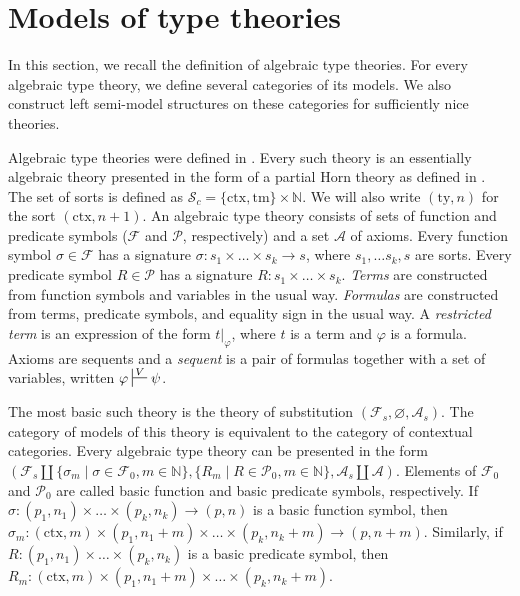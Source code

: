 \documentclass[reqno]{amsart}
\theoremstyle{definition}
\theoremstyle{remark}
\newcommand{\fs}[1]{\mathrm{#1}}
\numberwithin{figure}{section}
\begin{document}
\section{Models of type theories}

In this section, we recall the definition of algebraic type theories.
For every algebraic type theory, we define several categories of its models.
We also construct left semi-model structures on these categories for sufficiently nice theories.

Algebraic type theories were defined in \cite{alg-tt}.
Every such theory is an essentially algebraic theory presented in the form of a partial Horn theory as defined in \cite{PHL}.
The set of sorts is defined as $\mathcal{S}_c = \{ \fs{ctx}, \fs{tm} \} \times \mathbb{N}$.
We will also write $(\fs{ty},n)$ for the sort $(\fs{ctx},n+1)$.
An algebraic type theory consists of sets of function and predicate symbols ($\mathcal{F}$ and $\mathcal{P}$, respectively) and a set $\mathcal{A}$ of axioms.
Every function symbol $\sigma \in \mathcal{F}$ has a signature $\sigma : s_1 \times \ldots \times s_k \to s$, where $s_1, \ldots s_k, s$ are sorts.
Every predicate symbol $R \in \mathcal{P}$ has a signature $R : s_1 \times \ldots \times s_k$.
\emph{Terms} are constructed from function symbols and variables in the usual way.
\emph{Formulas} are constructed from terms, predicate symbols, and equality sign in the usual way.
A \emph{restricted term} is an expression of the form $t|_\varphi$, where $t$ is a term and $\varphi$ is a formula.
Axioms are sequents and a \emph{sequent} is a pair of formulas together with a set of variables, written $\varphi \sststile{}{V} \psi$.

The most basic such theory is the theory of substitution $(\mathcal{F}_s, \varnothing, \mathcal{A}_s)$.
The category of models of this theory is equivalent to the category of contextual categories.
Every algebraic type theory can be presented in the form $(\mathcal{F}_s \amalg \{ \sigma_m \mid \sigma \in \mathcal{F}_0, m \in \mathbb{N} \}, \{ R_m \mid R \in \mathcal{P}_0, m \in \mathbb{N} \}, \mathcal{A}_s \amalg \mathcal{A})$.
Elements of $\mathcal{F}_0$ and $\mathcal{P}_0$ are called basic function and basic predicate symbols, respectively.
If $\sigma : (p_1,n_1) \times \ldots \times (p_k,n_k) \to (p,n)$ is a basic function symbol, then $\sigma_m : (\fs{ctx},m) \times (p_1,n_1+m) \times \ldots \times (p_k,n_k+m) \to (p,n+m)$.
Similarly, if $R : (p_1,n_1) \times \ldots \times (p_k,n_k)$ is a basic predicate symbol, then $R_m : (\fs{ctx},m) \times (p_1,n_1+m) \times \ldots \times (p_k,n_k+m)$.
\end{document}
